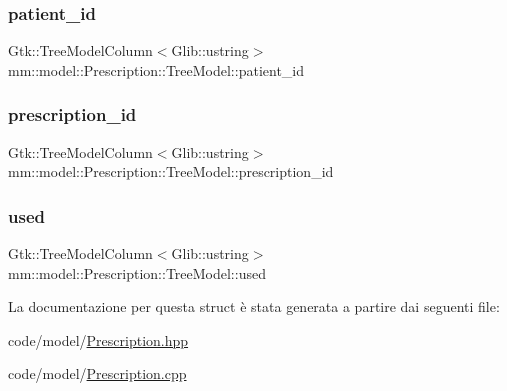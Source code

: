 \subsubsection{\texorpdfstring{patient\+\_\+id}{patient\_id}}
{\footnotesize\ttfamily Gtk\+::\+Tree\+Model\+Column$<$Glib\+::ustring$>$ mm\+::model\+::\+Prescription\+::\+Tree\+Model\+::patient\+\_\+id}

\mbox{\label{structmm_1_1model_1_1_prescription_1_1_tree_model_ab9c6e53985f8fba26f6b423ba4e3e12c}} 
\subsubsection{\texorpdfstring{prescription\+\_\+id}{prescription\_id}}
{\footnotesize\ttfamily Gtk\+::\+Tree\+Model\+Column$<$Glib\+::ustring$>$ mm\+::model\+::\+Prescription\+::\+Tree\+Model\+::prescription\+\_\+id}

\mbox{\label{structmm_1_1model_1_1_prescription_1_1_tree_model_abaa5eab3650e690c64385bd364526250}} 
\subsubsection{\texorpdfstring{used}{used}}
{\footnotesize\ttfamily Gtk\+::\+Tree\+Model\+Column$<$Glib\+::ustring$>$ mm\+::model\+::\+Prescription\+::\+Tree\+Model\+::used}



La documentazione per questa struct è stata generata a partire dai seguenti file\+:\begin{DoxyCompactItemize}
\item 
code/model/\mbox{\hyperlink{_prescription_8hpp}{Prescription.\+hpp}}\item 
code/model/\mbox{\hyperlink{_prescription_8cpp}{Prescription.\+cpp}}\end{DoxyCompactItemize}
